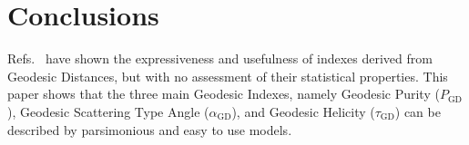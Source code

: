 \documentclass[journal]{IEEEtran}
\begin{document}



\section{Conclusions}

Refs.~\cite{ClassificationPolSARGeodesic,AGeneralizedVolumeScatteringModelBasedVegetationIndexfromPolarimetricSARData2019,NovelTechniquesforBuiltupAreaExtractionfromPolarimetricSARImages2019,APolSARScatteringPowerFactorizationFrameworkandNovelRollInvariantParametersBasedUnsupervisedClassificationSchemeUsingaGeodesicDistanceinpress,ChangeDetectionPolSARGeodesicDistanceBetweenScatteringMechanisms,ARadarVegetationIndexforCropMonitoringUsingCompactPolarimetricSARData}
have shown the expressiveness and usefulness of indexes derived from Geodesic Distances, but with no assessment of their statistical properties.
This paper shows that the three main Geodesic Indexes, namely
Geodesic Purity ($P_{\text{GD}}$),
Geodesic Scattering Type Angle ($\alpha_{\text{GD}}$), and
Geodesic Helicity ($\tau_{\text{GD}}$) can be described by parsimonious and easy to use models.
\end{document}
